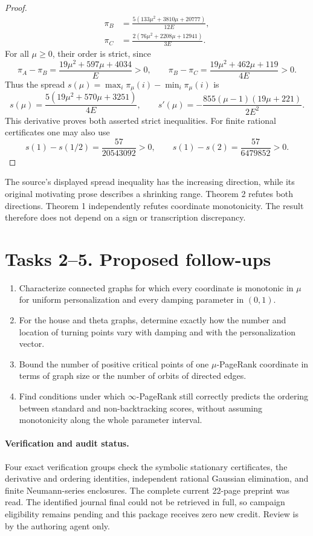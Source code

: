 \documentclass[11pt]{article}
\begin{document}
\begin{proof}
\begin{align*}
 \pi_B&=\frac{5(133\mu^2+3810\mu+20777)}{12E},\\
 \pi_C&=\frac{2(76\mu^2+2208\mu+12941)}{3E}.
\end{align*}
For all $\mu\ge0$, their order is strict, since
\[
 \pi_A-\pi_B=\frac{19\mu^2+597\mu+4034}{E}>0,\qquad
 \pi_B-\pi_C=\frac{19\mu^2+462\mu+119}{4E}>0.
\]
Thus the spread $s(\mu)=\max_i\pi_\mu(i)-\min_i\pi_\mu(i)$ is
\[
 s(\mu)=\frac{5(19\mu^2+570\mu+3251)}{4E},\qquad
 s'(\mu)=-\frac{855(\mu-1)(19\mu+221)}{2E^2}.                  \tag{6}
\]
This derivative proves both asserted strict inequalities. For
finite rational certificates one may also use
\[
 s(1)-s(1/2)=\frac{57}{20543092}>0,\qquad
 s(1)-s(2)=\frac{57}{6479852}>0.
\]
\end{proof}

The source's displayed spread inequality has the increasing
direction, while its original motivating prose describes a
shrinking range. Theorem 2 refutes both directions. Theorem 1
independently refutes coordinate monotonicity. The result therefore
does not depend on a sign or transcription discrepancy.

\section*{Tasks 2--5. Proposed follow-ups}
\begin{enumerate}[label=\textbf{Task \arabic*.},start=2,leftmargin=*]
\item Characterize connected graphs for which every coordinate
is monotonic in $\mu$ for uniform personalization and every damping
parameter in $(0,1)$.
\item For the house and theta graphs, determine exactly how the
number and location of turning points vary with damping and with
the personalization vector.
\item Bound the number of positive critical points of one
$\mu$-PageRank coordinate in terms of graph size or the number of
orbits of directed edges.
\item Find conditions under which $\infty$-PageRank still correctly
predicts the ordering between standard and non-backtracking scores,
without assuming monotonicity along the whole parameter interval.
\end{enumerate}

\paragraph{Verification and audit status.}
Four exact verification groups check the symbolic stationary
certificates, the derivative and ordering identities, independent
rational Gaussian elimination, and finite Neumann-series enclosures.
The complete current 22-page preprint was read. The identified
journal final could not be retrieved in full, so campaign eligibility
remains pending and this package receives zero new credit. Review
is by the authoring agent only.
\end{document}
